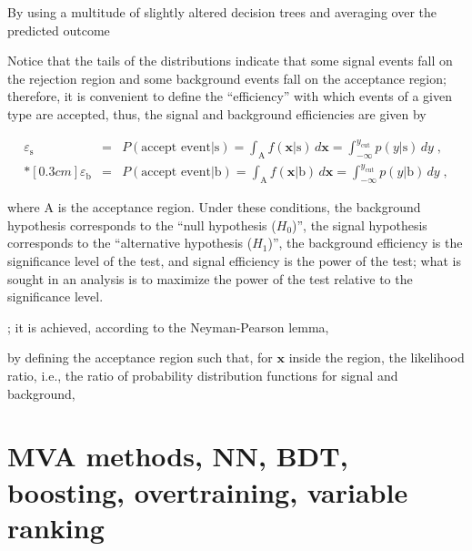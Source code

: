 By using a multitude of slightly altered decision trees and averaging over the predicted outcome




 Notice that the tails of the distributions indicate that some signal events fall on the rejection region and some background events fall on the acceptance region; therefore, it is convenient to define the ``efficiency'' with which events of a given type are accepted, thus, the signal and background efficiencies are given by 

\begin{eqnarray}
\label{eq:sigeff}
\varepsilon_{\textrm{s}} & = & P( \mbox{accept event} | \mbox{s} ) = \int_{\textrm{A}} f(\textbf{x} | \mbox{s} ) \, d \textbf{x} = \int_{-\infty}^{y_{\textrm{cut}}} p(y | \mbox{s}) \, dy\;, \\*[0.3 cm]
\varepsilon_{\textrm{b}} & = & P( \mbox{accept event} | \mbox{b} ) = \int_{\textrm{A}} f(\textbf{x} | \mbox{b} ) \, d \textbf{x} = \int_{-\infty}^{y_{\textrm{cut}}} p(y | \mbox{b}) \, dy \;,
\end{eqnarray}

where A is the acceptance region. Under these conditions, the background hypothesis corresponds to the ``null hypothesis ($H_0$)'', the signal hypothesis corresponds to the ``alternative hypothesis ($H_1$)'', the background efficiency is the significance level of the test, and signal efficiency is the power of the test; what is sought in an analysis is to maximize the power of the test relative to the significance level.








; it is achieved, according to the Neyman-Pearson lemma\cite{npl},






by defining the acceptance region such that, for $\textbf{x}$ inside the region, the likelihood ratio, i.e., the ratio of probability distribution functions for signal and background,







\section{ MVA methods, NN, BDT, boosting, overtraining, variable ranking  }
